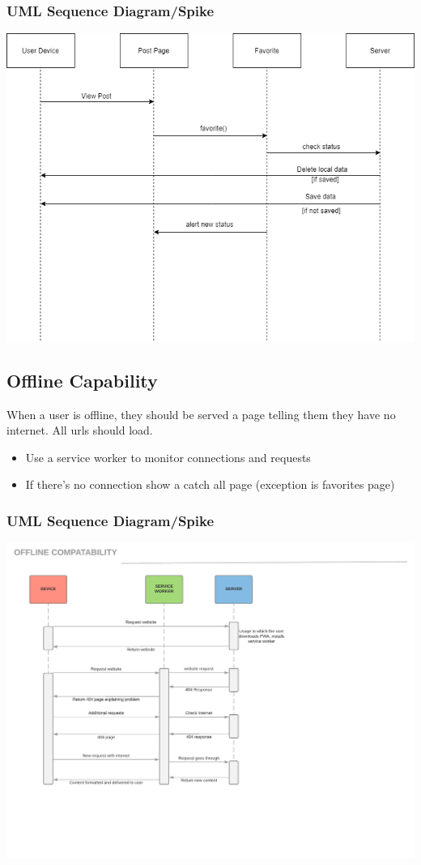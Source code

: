 \documentclass[12pt]{article}
\begin{document}
\subsubsection{UML Sequence Diagram/Spike}
\includegraphics[scale=0.5]{img/9.png}\linebreak

\subsection{Offline Capability}
When a user is offline, they should be served a page telling them they have no
internet. All urls should load.
\begin{itemize}
  \item Use a service worker to monitor connections and requests
  \item If there’s no connection show a catch all page (exception is favorites page)
\end{itemize}
\subsubsection{UML Sequence Diagram/Spike}
\includegraphics[scale=0.5]{img/10.png}\linebreak
\end{document}
